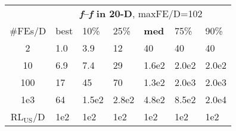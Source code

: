 \begin{tabular}{c|llllll}
 & \multicolumn{6}{|c}{\textbf{\textit{f}\raisebox{-0.35ex}{1}--\textit{f}\raisebox{-0.35ex}{24} in 20-D}, maxFE/D=102}\\
\#FEs/D & best & 10\% & 25\% & \textbf{med} & 75\% & 90\%\\
2 & \hspace*{1ex}1.0 & \hspace*{1ex}3.9 & 12 & 40 & 40 & 40\\
10 & \hspace*{1ex}6.9 & \hspace*{1ex}7.4 & 29 & 1.6e2 & 2.0e2 & 2.0e2\\
100 & 17 & 45 & 70 & 1.3e2 & 2.0e3 & 2.0e3\\
1e3 & 64 & 1.5e2 & 2.8e2 & 4.8e2 & 8.5e2 & 2.0e4\\
$\text{RL}_{\text{US}}$/D & 1e2 & 1e2 & 1e2 & 1e2 & 1e2 & 1e2
\end{tabular}
